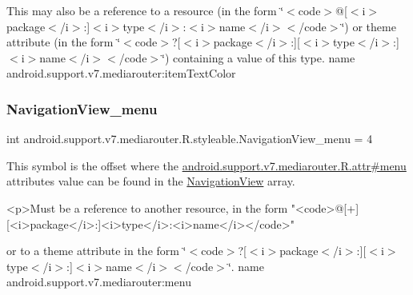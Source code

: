 This may also be a reference to a resource (in the form \char`\"{}$<$code$>$@\mbox{[}$<$i$>$package$<$/i$>$\+:\mbox{]}$<$i$>$type$<$/i$>$\+:$<$i$>$name$<$/i$>$$<$/code$>$\char`\"{}) or theme attribute (in the form \char`\"{}$<$code$>$?\mbox{[}$<$i$>$package$<$/i$>$\+:\mbox{]}\mbox{[}$<$i$>$type$<$/i$>$\+:\mbox{]}$<$i$>$name$<$/i$>$$<$/code$>$\char`\"{}) containing a value of this type.  name android.\+support.\+v7.\+mediarouter\+:item\+Text\+Color \mbox{\label{classandroid_1_1support_1_1v7_1_1mediarouter_1_1R_1_1styleable_ad31f7de14ec7c207bec4854f7a839a82}} 
\subsubsection{\texorpdfstring{Navigation\+View\+\_\+menu}{NavigationView\_menu}}
{\footnotesize\ttfamily int android.\+support.\+v7.\+mediarouter.\+R.\+styleable.\+Navigation\+View\+\_\+menu = 4\hspace{0.3cm}{\ttfamily [static]}}

This symbol is the offset where the \hyperlink{classandroid_1_1support_1_1v7_1_1mediarouter_1_1R_1_1attr_af562bc4c0c7889d849b35009c24ff701}{android.\+support.\+v7.\+mediarouter.\+R.\+attr\#menu} attribute\textquotesingle{}s value can be found in the \hyperlink{classandroid_1_1support_1_1v7_1_1mediarouter_1_1R_1_1styleable_a9216c77e145f14d4fdd264c2381fce44}{Navigation\+View} array.

\begin{DoxyVerb}      <p>Must be a reference to another resource, in the form "<code>@[+][<i>package</i>:]<i>type</i>:<i>name</i></code>"
\end{DoxyVerb}
 or to a theme attribute in the form \char`\"{}$<$code$>$?\mbox{[}$<$i$>$package$<$/i$>$\+:\mbox{]}\mbox{[}$<$i$>$type$<$/i$>$\+:\mbox{]}$<$i$>$name$<$/i$>$$<$/code$>$\char`\"{}.  name android.\+support.\+v7.\+mediarouter\+:menu \mbox{\label{classandroid_1_1support_1_1v7_1_1mediarouter_1_1R_1_1styleable_a9b218bd30c0404b44b45f04537f6bcb7}} 
